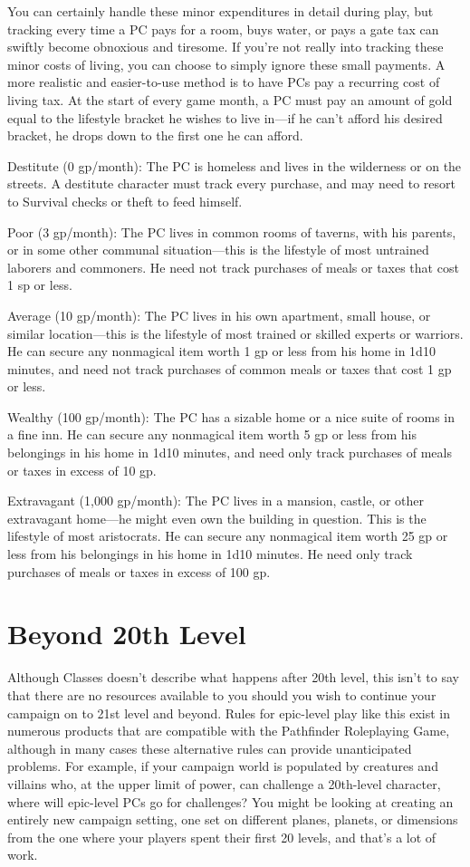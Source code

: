 You can certainly handle these minor expenditures in detail during play, but tracking every time a PC pays for a room, buys water, or pays a gate tax can swiftly become obnoxious and tiresome. If you're not really into tracking these minor costs of living, you can choose to simply ignore these small payments. A more realistic and easier-to-use method is to have PCs pay a recurring cost of living tax. At the start of every game month, a PC must pay an amount of gold equal to the lifestyle bracket he wishes to live in---if he can't afford his desired bracket, he drops down to the first one he can afford.
				
Destitute (0 gp/month): The PC is homeless and lives in the wilderness or on the streets. A destitute character must track every purchase, and may need to resort to Survival checks or theft to feed himself.
				
Poor (3 gp/month): The PC lives in common rooms of taverns, with his parents, or in some other communal situation---this is the lifestyle of most untrained laborers and commoners. He need not track purchases of meals or taxes that cost 1 sp or less.
				
Average (10 gp/month): The PC lives in his own apartment, small house, or similar location---this is the lifestyle of most trained or skilled experts or warriors. He can secure any nonmagical item worth 1 gp or less from his home in 1d10 minutes, and need not track purchases of common meals or taxes that cost 1 gp or less.
				
Wealthy (100 gp/month): The PC has a sizable home or a nice suite of rooms in a fine inn. He can secure any nonmagical item worth 5 gp or less from his belongings in his home in 1d10 minutes, and need only track purchases of meals or taxes in excess of 10 gp.
				
Extravagant (1,000 gp/month): The PC lives in a mansion, castle, or other extravagant home---he might even own the building in question. This is the lifestyle of most aristocrats. He can secure any nonmagical item worth 25 gp or less from his belongings in his home in 1d10 minutes. He need only track purchases of meals or taxes in excess of 100 gp.
				
\section{Beyond 20th Level}

				
Although Classes doesn't describe what happens after 20th level, this isn't to say that there are no resources available to you should you wish to continue your campaign on to 21st level and beyond. Rules for epic-level play like this exist in numerous products that are compatible with the Pathfinder Roleplaying Game, although in many cases these alternative rules can provide unanticipated problems. For example, if your campaign world is populated by creatures and villains who, at the upper limit of power, can challenge a 20th-level character, where will epic-level PCs go for challenges? You might be looking at creating an entirely new campaign setting, one set on different planes, planets, or dimensions from the one where your players spent their first 20 levels, and that's a lot of work.
				

